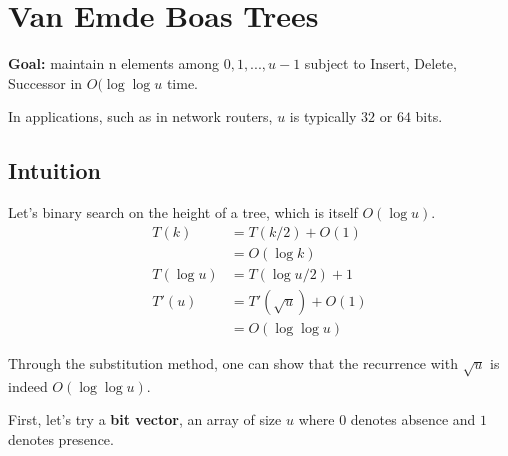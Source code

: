 \documentclass[12pt]{article}
\begin{document}
\section*{Van Emde Boas Trees}
\par{\textbf{Goal:} maintain n elements among ${0, 1, ..., u - 1}$ subject to Insert, Delete, Successor in $O(\log{\log{u}}$ time.}
\par{In applications, such as in network routers, $u$ is typically $32$ or $64$ bits.}
\subsection*{Intuition}
\par{Let's binary search on the height of a tree, which is itself $O(\log{u})$.}
\begin{align*}
T(k) &= T(k/2) + O(1) \\
&= O(\log{k}) \\
T(\log{u}) &= T(\log{u}/2) + 1 \\
T'(u) &= T'(\sqrt{u}) + O(1) \\
&= O(\log{\log{u}})
\end{align*}
\par{Through the substitution method, one can show that the recurrence with $\sqrt{u}$ is indeed $O(\log{\log{u}})$.}
\par{First, let's try a \textbf{bit vector}, an array of size $u$ where $0$ denotes absence and $1$ denotes presence.}
\end{document}
